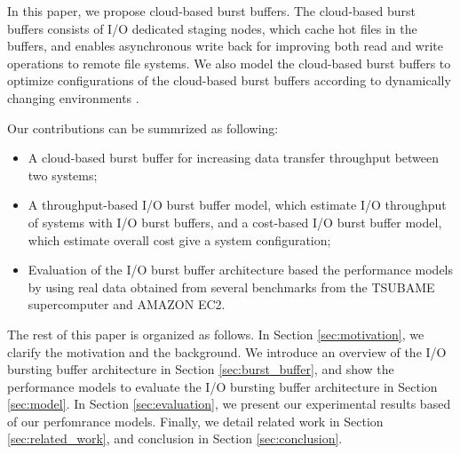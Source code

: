 In this paper, we propose cloud-based burst buffers. The cloud-based burst buffers consists of I/O dedicated staging nodes, which cache hot files in the buffers, and enables asynchronous write back for improving both read and write operations to remote file systems.
We also model the cloud-based burst buffers to optimize  configurations of the cloud-based burst buffers according to dynamically changing environments
.


Our contributions can be summrized as following:
\begin{itemize}
	\item A cloud-based burst buffer for increasing data transfer throughput between two systems;
	\item A throughput-based I/O burst buffer model, which estimate I/O throughput of systems with I/O burst buffers, and a cost-based I/O burst buffer model, which estimate overall cost give a system configuration;
        \item Evaluation of the I/O burst buffer architecture based the performance models by using real data obtained from several benchmarks from the TSUBAME supercomputer and AMAZON EC2.
\end{itemize}
The rest of this paper is organized as follows. 
In Section \ref{sec:motivation}, we clarify the motivation and the background.
We introduce an overview of the I/O bursting buffer architecture in Section \ref{sec:burst_buffer}, 
and show the performance models to evaluate the I/O bursting buffer architecture in Section \ref{sec:model}. 
In Section \ref{sec:evaluation}, we present our experimental results based of our perfomrance models. %
Finally, we detail related work in Section \ref{sec:related_work}, and conclusion in Section \ref{sec:conclusion}.
